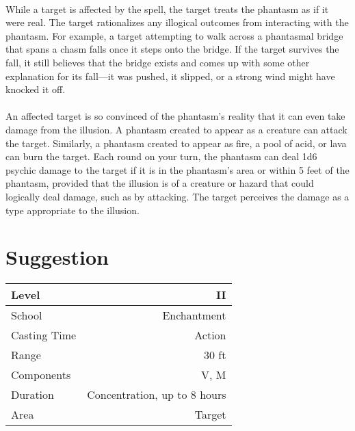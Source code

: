 \documentclass[a5paper,12pt]{article}
\begin{document}
\paragraph{}
While a target is affected by the spell, the target treats the phantasm as if it were real. The target rationalizes any illogical outcomes from interacting with the phantasm. For example, a target attempting to walk across a phantasmal bridge that spans a chasm falls once it steps onto the bridge. If the target survives the fall, it still believes that the bridge exists and comes up with some other explanation for its fall—it was pushed, it slipped, or a strong wind might have knocked it off.

\paragraph{}
An affected target is so convinced of the phantasm's reality that it can even take damage from the illusion. A phantasm created to appear as a creature can attack the target. Similarly, a phantasm created to appear as fire, a pool of acid, or lava can burn the target. Each round on your turn, the phantasm can deal 1d6 psychic damage to the target if it is in the phantasm's area or within 5 feet of the phantasm, provided that the illusion is of a creature or hazard that could logically deal damage, such as by attacking. The target perceives the damage as a type appropriate to the illusion.
\normalsize{}

\newpage

\section*{Suggestion}
\begin{table}[h]
   \centering
   \begin{tabular}{|l|r|}
      \hline
      Level        & II \\
      \hline
      School       & Enchantment \\
      \hline
      Casting Time & Action \\
      \hline
      Range        & 30 ft \\
      \hline
      Components   & V, M \\
      \hline
      Duration     & Concentration, up to 8 hours\\
      \hline
      Area         & Target \\
      \hline
   \end{tabular}
\end{table}
\end{document}
